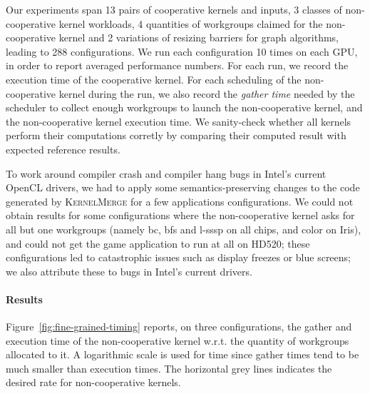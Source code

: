\documentclass[numbers,nocopyrightspace,10pt]{sigplanconf}
\newcommand{\kernelmerge}{\textsc{KernelMerge}}
\newcommand{\myfiglong}{Figure~}
\begin{document}
Our experiments span 13 pairs of cooperative kernels and inputs, 3
classes of non-cooperative kernel workloads, 4 quantities of workgroups
claimed for the non-cooperative kernel and 2 variations of resizing
barriers for graph algorithms, leading to 288 configurations.  We run
each configuration 10 times on each GPU, in order to report averaged
performance numbers. For each run, we record the execution time of the
cooperative kernel. For each scheduling of the non-cooperative kernel
during the run, we also record the \emph{gather time} needed by the
scheduler to collect enough workgroups to launch the non-cooperative
kernel, and the non-cooperative kernel execution time. We sanity-check
whether all kernels perform their computations corretly by comparing
their computed result with expected reference results.

To work around compiler crash and compiler hang bugs in Intel's current
OpenCL drivers, we had to apply some semantics-preserving changes to the
code generated by \kernelmerge{} for a few applications configurations.
We could not obtain results for some configurations where the
non-cooperative kernel asks for all but one workgroups (namely bc, bfs
and l-sssp on all chips, and color on Iris), and could not get the game
application to run at all on HD520; these configurations led to
catastrophic issues such as display freezes or blue screens; we also
attribute these to bugs in Intel's current drivers.


\paragraph{Results}

\myfiglong\ref{fig:fine-grained-timing} reports, on three
configurations, the gather and execution time of the non-cooperative
kernel w.r.t. the quantity of workgroups allocated to it. A logarithmic
scale is used for time since gather times tend to be much smaller than
execution times. The horizontal grey lines indicates the desired rate
for non-cooperative kernels.
\end{document}

